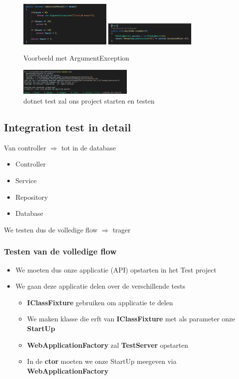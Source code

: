 \documentclass{article}
\begin{document}
\begin{figure}[H]
    \centering
    \includegraphics[width=0.4\textwidth]{unit-test3.png}
    \includegraphics[width=0.4\textwidth]{unit-test4.png}
    \caption{Voorbeeld met ArgumentException}
\end{figure}

\begin{figure}[H]
    \centering
    \includegraphics[width=0.5\textwidth]{dotnet-test.png}
    \caption{dotnet test zal ons project starten en testen}
\end{figure}

\subsection{Integration test in detail}

Van controller $\Rightarrow$ tot in de database

\begin{itemize}
    \item Controller
    \item Service
    \item Repository
    \item Database
\end{itemize}

We testen dus de volledige flow $\Rightarrow$ trager

\subsubsection{Testen van de volledige flow}

\begin{itemize}
    \item We moeten dus onze applicatie (API) opstarten in het Test project
    \item We gaan deze applicatie delen over de verschillende tests
    \begin{itemize}
        \item \textbf{IClassFixture} gebruiken om applicatie te delen
        \item We maken klasse die erft van \textbf{IClassFixture} met als parameter onze \textbf{StartUp}
        \item \textbf{WebApplicationFactory} zal \textbf{TestServer} opstarten
        \item In de \textbf{ctor} moeten we onze StartUp meegeven via \textbf{WebApplicationFactory}
    \end{itemize}
\end{itemize}
\end{document}
